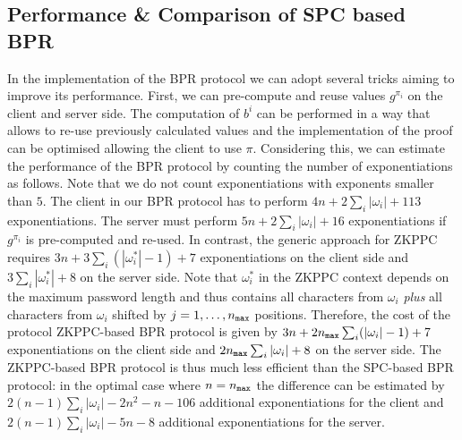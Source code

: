 \subsection{Performance \& Comparison of SPC based BPR} \label{sec:performance}
In the implementation of the \ac{BPR} protocol we can adopt several tricks aiming to improve its performance. First, we can pre-compute and reuse values $g^{\pi_i}$ on the client and server side.
The computation of $b^i$ can be performed in a way that allows to re-use previously calculated values and the implementation of the proof can be optimised allowing the client to use $\pi$.
Considering this, we can estimate the performance of the \ac{BPR} protocol by counting the number of exponentiations as follows.
Note that we do not count exponentiations with exponents smaller than $5$.
%
The client in our BPR protocol has to perform $4n+2\sum_i |\omega_i| + 113$ exponentiations.
The server must perform $5n + 2\sum_i |\omega_i| + 16$ exponentiations if $g^{\pi_i}$ is pre-computed and re-used.
In contrast, the generic approach for \ac{ZKPPC} requires $3n+3\sum_i (|\omega^\ast_i|-1)+7$ exponentiations on the client side and $3\sum_i |\omega^\ast_i|+8$ on the server side.
Note that $\omega^\ast_i$ in the \ac{ZKPPC} context depends on the maximum password length and thus contains all characters from $\omega_i$ \emph{plus} all characters from $\omega_i$ shifted by $j = 1,\ldots, {n_\mathtt{max}}$ positions.
Therefore, the cost of the protocol \ac{ZKPPC}-based \ac{BPR} protocol is given by $3n+2{n_\mathtt{max}}\sum_i (|\omega_i|-1)+7$ exponentiations on the client side and $2{n_\mathtt{max}}\sum_i |\omega_i|+8$ on the server side. 
The \ac{ZKPPC}-based \ac{BPR} protocol is thus much less efficient than the \ac{SPC}-based \ac{BPR} protocol: in the optimal case where $n={n_\mathtt{max}}$ the difference can be estimated by  $2(n-1)\sum_i|\omega_i| - 2n^2 - n - 106$ additional exponentiations for the client and $2(n-1)\sum_i|\omega_i| - 5n - 8$ additional exponentiations for the server.

